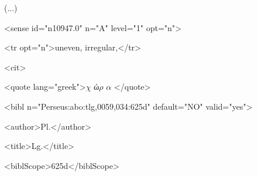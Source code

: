 \documentclass[10pt]{article}
\begin{document}
\begin{adjustwidth}{0.71in}{0.0in}
 (...)\par

\end{adjustwidth}

\begin{adjustwidth}{0.71in}{0.0in}
 <sense id="n10947.0" n="A" level="1" opt="n">\par

\end{adjustwidth}

\begin{adjustwidth}{0.85in}{0.0in}
 <tr opt="n">uneven, irregular,</tr>\par

\end{adjustwidth}

\begin{adjustwidth}{0.85in}{0.0in}
 <cit>\par

\end{adjustwidth}

\begin{adjustwidth}{0.99in}{0.0in}
 <quote lang="greek">$ \chi $ ώ$ \rho $ $ \alpha $ </quote>\par

\end{adjustwidth}

\begin{adjustwidth}{0.99in}{0.0in}
 <bibl n="Perseus:abo:tlg,0059,034:625d" default="NO" valid="yes">\par

\end{adjustwidth}

\begin{adjustwidth}{1.12in}{0.0in}
 <author>Pl.</author>\par

\end{adjustwidth}

\begin{adjustwidth}{1.12in}{0.0in}
 <title>Lg.</title>\par

\end{adjustwidth}

\begin{adjustwidth}{1.12in}{0.0in}
 <biblScope>625d</biblScope>\par

\end{adjustwidth}
\end{document}
